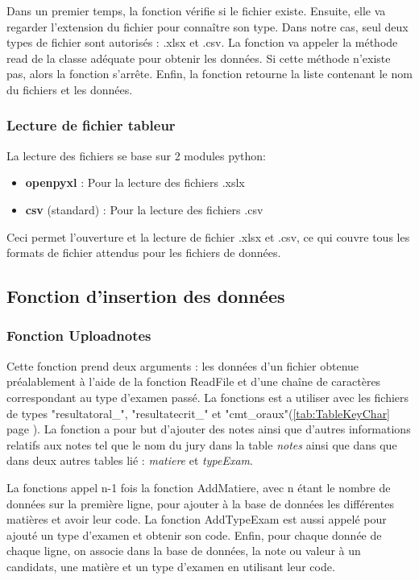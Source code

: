 Dans un premier temps, la fonction vérifie si le fichier existe. Ensuite, elle va regarder l'extension du fichier pour connaître son type. Dans notre cas, seul deux types de fichier sont autorisés : .xlsx et .csv.
La fonction va appeler la méthode read de la classe adéquate pour obtenir les données. Si cette méthode n'existe pas, alors la fonction s'arrête. Enfin, la fonction retourne la liste contenant le nom du fichiers et les données.

\subsubsection{Lecture de fichier tableur}

La lecture des fichiers se base sur 2 modules python:

\begin{itemize}
    \item \textbf{openpyxl} : Pour la lecture des fichiers .xslx
    \item \textbf{csv} (standard) : Pour la lecture des fichiers .csv
\end{itemize}

Ceci permet l'ouverture et la lecture de fichier .xlsx et .csv, ce qui couvre tous les formats de fichier attendus pour les fichiers de données.

\subsection{Fonction d'insertion des données}

\subsubsection{Fonction Uploadnotes}


Cette fonction prend deux arguments : les données d'un fichier obtenue préalablement à l'aide de la fonction ReadFile et d'une chaîne de caractères  correspondant au type d'examen passé. La fonctions est a utiliser avec les fichiers  de types "resultatoral\_", "resultatecrit\_" et "cmt\_oraux"(\ref{tab:TableKeyChar} page \pageref{tab:TableKeyChar}).
La fonction a pour but d'ajouter des notes ainsi que d'autres informations relatifs aux notes tel que le nom du jury dans la table \textit{notes} ainsi que dans que dans deux autres tables lié : \textit{matiere} et \textit{typeExam}.

La fonctions appel n-1 fois la fonction AddMatiere, avec n étant le nombre de données sur la première ligne, pour ajouter à la base de données les différentes matières et avoir leur code.
La fonction AddTypeExam est aussi appelé pour ajouté un type d'examen et obtenir son code.
Enfin, pour chaque donnée de chaque ligne, on associe dans la base de données, la note ou valeur à un candidats, une matière et un type d'examen en utilisant leur code.

